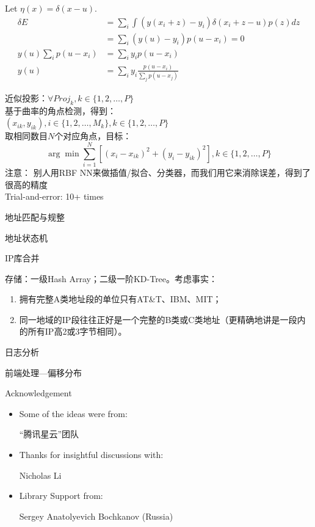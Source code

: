\documentclass{beamer}
\begin{document}
\begin{frame}
Let $\eta(x)=\delta(x-u)$.
\begin{align}
\delta E & = \sum_i \int (y(x_i+z)-y_i)\delta(x_i+z-u) p(z) dz \\
& = \sum_i (y(u)-y_i) p(u-x_i) = 0\\
y(u)\sum_i p(u-x_i) & = \sum_i y_i p(u-x_i) \\
y(u) & = \sum_i y_i \frac{p(u-x_i)}{\sum_j p(u-x_j)}
\end{align}
\end{frame}
\begin{frame}
\pause 
近似投影：$\forall Proj_k, k \in \{1, 2, \ldots, P\}$\\
\pause 
基于曲率的角点检测，得到：\\
$(x_{ik}, y_{ik}), i \in \{1, 2, \ldots, M_k\},  k \in \{1, 2, \ldots, P\}$\\
\pause 
取相同数目$N$个对应角点，目标：
\begin{equation}
\arg \min \sum_{i=1}^{N}{[(x_i - x_{ik})^2 + (y_i - y_{ik})^2]}, k \in \{1, 2, \ldots, P\}
\end{equation}
\pause 
注意：
别人用RBF NN来做插值/拟合、分类器，而我们用它来消除误差，得到了很高的精度\\
Trial-and-error: 10+ times
\end{frame}
\begin{frame}{地址匹配与规整}

\end{frame}
\begin{frame}{地址状态机}

\end{frame}
\begin{frame}{IP库合并}

\pause 存储：一级Hash Array；二级一阶KD-Tree。\pause 考虑事实：
\begin{enumerate}
\item 拥有完整A类地址段的单位只有AT\&T、IBM、MIT；
\item 同一地域的IP段往往正好是一个完整的B类或C类地址（更精确地讲是一段内的所有IP高2或3字节相同）。
\end{enumerate}
\end{frame}
\begin{frame}{日志分析}

\end{frame}
\begin{frame}{前端处理---偏移分布}

\end{frame}
\begin{frame}{Acknowledgement}
\begin{itemize}
\item  Some of the ideas were from: 

“腾讯星云”团队
\item  Thanks for insightful discussions with: 

Nicholas Li
\item Library Support from: 

Sergey Anatolyevich Bochkanov (Russia)
\end{itemize}
\end{frame}
\end{document}
